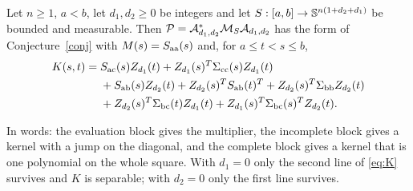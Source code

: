 \begin{lemma}\label{lem:kernel}
Let $n\ge1$, $a<b$, let $d_1,d_2\ge0$ be integers and let $S:[a,b]\to\mathbb{S}^{n(1+d_2+d_1)}$ be bounded and measurable. Then $\mathcal{P}=\mathcal{A}_{d_1,d_2}^*\mathcal{M}_S\mathcal{A}_{d_1,d_2}$ has the form of Conjecture~\ref{conj} with $M(s)=S_{\mathrm{a}\mathrm{a}}(s)$ and, for $a\le t<s\le b$,
\begin{equation}\label{eq:K}
\begin{aligned}
K(s,t)={}&S_{\mathrm{a}\mathrm{c}}(s)Z_{d_1}(t)+Z_{d_1}(s)^T\Sigma_{\mathrm{c}\mathrm{c}}(s)Z_{d_1}(t)\\
&+S_{\mathrm{a}\mathrm{b}}(s)Z_{d_2}(t)+Z_{d_2}(s)^TS_{\mathrm{a}\mathrm{b}}(t)^T+Z_{d_2}(s)^T\Sigma_{\mathrm{b}\mathrm{b}}Z_{d_2}(t)\\
&+Z_{d_2}(s)^T\Sigma_{\mathrm{b}\mathrm{c}}(t)Z_{d_1}(t)+Z_{d_1}(s)^T\Sigma_{\mathrm{b}\mathrm{c}}(s)^TZ_{d_2}(t).
\end{aligned}
\end{equation}
\end{lemma}
In words: the evaluation block gives the multiplier, the incomplete block gives a kernel with a jump on the diagonal, and the complete block gives a kernel that is one polynomial on the whole square. With $d_1=0$ only the second line of \eqref{eq:K} survives and $K$ is separable; with $d_2=0$ only the first line survives.

